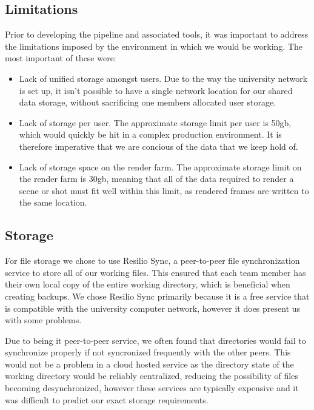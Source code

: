 \documentclass[11pt]{article}
\begin{document}
\subsection{Limitations}

Prior to developing the pipeline and associated tools, it was important to address the limitations imposed by the environment in which we would be working. The most important of these were:

\begin{itemize}

\item Lack of unified storage amongst users. Due to the way the university network is set up, it isn't possible to have a single network location for our shared data storage, without sacrificing one members allocated user storage.

\item Lack of storage per user. The approximate storage limit per user is 50gb, which would quickly be hit in a complex production environment. It is therefore imperative that we are concious of the data that we keep hold of.

\item Lack of storage space on the render farm. The approximate storage limit on the render farm is 30gb, meaning that all of the data required to render a scene or shot must fit well within this limit, as rendered frames are written to the same location.

\end{itemize}

\subsection{Storage}

For file storage we chose to use Resilio Sync, a peer-to-peer file synchronization service
to store all of our working files. This ensured that each team member has their own local copy of the entire working directory, which is beneficial when creating backups. We chose Resilio Sync primarily because it is a free service that is compatible with the university computer network, however it does present us with some problems.

Due to being it peer-to-peer service, we often found that directories would fail to synchronize properly if not syncronized frequently with the other peers. This would not be a problem in a cloud hosted service as the directory state of the working directory would be reliably centralized, reducing the possibility of files becoming desynchronized, however these services are typically expensive and it was difficult to predict our exact storage requirements.
\end{document}
